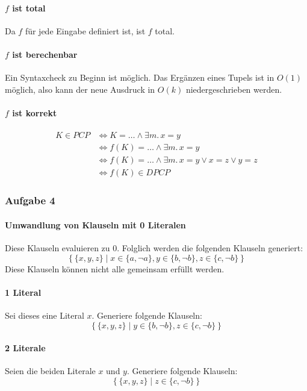 \paragraph{$f$ ist total} Da $f$ für jede Eingabe definiert ist, ist $f$ total.
\par

\paragraph{$f$ ist berechenbar} Ein Syntaxcheck zu Beginn ist möglich. Das
Ergänzen eines Tupels ist in $O(1)$ möglich, also kann der neue Ausdruck in
$O(k)$ niedergeschrieben werden.
\par

\paragraph{$f$ ist korrekt}
\begin{align*}
	K \in PCP &\iff K = \ldots \land \exists m.\, x = y \\
		  &\iff f(K) = \ldots \land \exists m.\, x = y\\
		  &\iff f(K) = \ldots \land \exists m.\, x = y \lor x = z \lor y
		  = z \\
		  &\iff f(K) \in DPCP
\end{align*}

\subsubsection{Aufgabe 4}

\paragraph{Umwandlung von Klauseln mit 0 Literalen}
Diese Klauseln evaluieren zu $0$. Folglich werden die folgenden Klauseln
generiert:
\[
	\left\{\{x,y,z\} \mid x \in \{a,\lnot a\}, y \in \{b,\lnot b\}, z \in
	\{c,\lnot b\}\right\}
\]
Diese Klauseln können nicht alle gemeinsam erfüllt werden.
\par
\paragraph{1 Literal}
Sei dieses eine Literal $x$. Generiere folgende Klauseln:
\[
	\left\{\{x,y,z\} \mid y \in \{b,\lnot b\}, z \in
	\{c,\lnot b\}\right\}
\]
\par
\paragraph{2 Literale}
Seien die beiden Literale $x$ und $y$. Generiere folgende Klauseln:
\[
	\left\{\{x,y,z\} \mid z \in
	\{c,\lnot b\}\right\}
\]
\par

